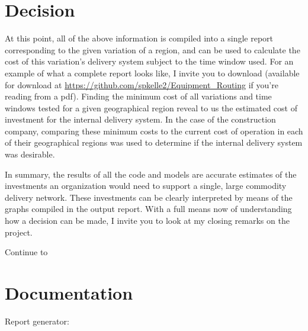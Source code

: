 \documentclass[letterpaper,10pt,english]{sphinxmanual}
\begin{document}
\noindent{}

\noindent{}


\section{Decision}
\label{\detokenize{reporting:decision}}
At this point, all of the above information is compiled into a single report
corresponding to the given variation of a region, and can be used to calculate
the cost of this variation's delivery system subject to the time window used.
For an example of what a complete report looks like, I invite you to download
 (available for
download at \url{https://github.com/spkelle2/Equipment\_Routing} if you're reading
from a pdf). Finding the minimum
cost of all variations and time windows tested for a given geographical region
reveal to us the estimated cost of investment for the internal delivery system.
In the case of the construction company, comparing these minimum costs to the
current cost of operation in each of their geographical regions was used to
determine if the internal delivery system was desirable.

In summary, the results of all the code and models are accurate estimates of
the investments an organization would need to support a single, large
commodity delivery network. These investments can be clearly interpreted by
means of the graphs compiled in the output report. With a full means now of
understanding how a decision can be made, I invite you to look at my closing
remarks on the project.

Continue to {\hyperref[\detokenize{conclusion:conclusion}]{}}


\section{Documentation}
\label{\detokenize{reporting:documentation}}
Report generator:
\end{document}
